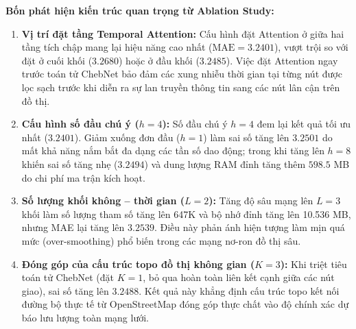 \textbf{Bốn phát hiện kiến trúc quan trọng từ Ablation Study:}
\begin{enumerate}
    \item \textbf{Vị trí đặt tầng Temporal Attention:} Cấu hình đặt Attention ở giữa hai tầng tích chập mang lại hiệu năng cao nhất ($\text{MAE} = 3.2401$), vượt trội so với đặt ở cuối khối ($3.2680$) hoặc ở đầu khối ($3.2485$). Việc đặt Attention ngay trước toán tử ChebNet bảo đảm các xung nhiễu thời gian tại từng nút được lọc sạch trước khi diễn ra sự lan truyền thông tin sang các nút lân cận trên đồ thị.
    \item \textbf{Cấu hình số đầu chú ý ($h=4$):} Số đầu chú ý $h=4$ đem lại kết quả tối ưu nhất ($3.2401$). Giảm xuống đơn đầu ($h=1$) làm sai số tăng lên $3.2501$ do mất khả năng nắm bắt đa dạng các tần số dao động; trong khi tăng lên $h=8$ khiến sai số tăng nhẹ ($3.2494$) và dung lượng RAM đỉnh tăng thêm $598.5$ MB do chi phí ma trận kích hoạt.
    \item \textbf{Số lượng khối không -- thời gian ($L=2$):} Tăng độ sâu mạng lên $L=3$ khối làm số lượng tham số tăng lên 647K và bộ nhớ đỉnh tăng lên 10.536 MB, nhưng MAE lại tăng lên $3.2539$. Điều này phản ánh hiện tượng làm mịn quá mức (over-smoothing) phổ biến trong các mạng nơ-ron đồ thị sâu.
    \item \textbf{Đóng góp của cấu trúc topo đồ thị không gian ($K=3$):} Khi triệt tiêu toán tử ChebNet (đặt $K=1$, bỏ qua hoàn toàn liên kết cạnh giữa các nút giao), sai số tăng lên $3.2488$. Kết quả này khẳng định cấu trúc topo kết nối đường bộ thực tế từ OpenStreetMap đóng góp thực chất vào độ chính xác dự báo lưu lượng toàn mạng lưới.
\end{enumerate}
